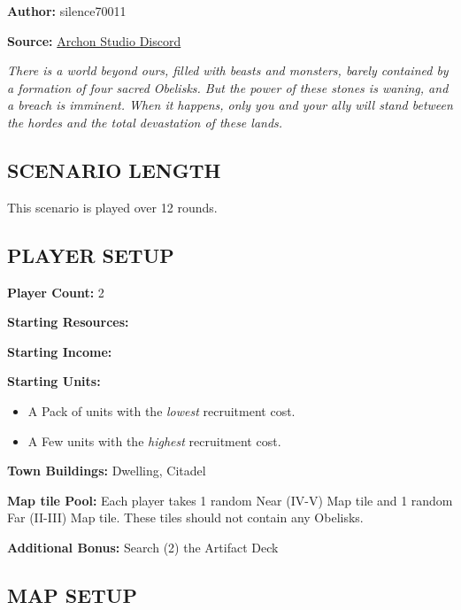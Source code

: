 
\begin{multicols}{2}

\textbf{Author:} silence70011

\textbf{Source:} \href{https://discord.com/channels/740870068178649108/1233112440322002964/1233112440322002964}{Archon Studio Discord}

\textit{There is a world beyond ours, filled with beasts and monsters, barely contained by a formation of four sacred Obelisks.
  But the power of these stones is waning, and a breach is imminent.
  When it happens, only you and your ally will stand between the hordes and the total devastation of these lands.
}

\subsection*{\MakeUppercase{Scenario Length}}

This scenario is played over 12 rounds.

\subsection*{\MakeUppercase{Player Setup}}

\textbf{Player Count:} 2

\textbf{Starting Resources:}\par
{}

\textbf{Starting Income:}\par
{}

\textbf{Starting Units:}
\begin{itemize}
  \item A Pack of  units with the \textit{lowest} recruitment cost.
  \item A Few  units with the \textit{highest} recruitment cost.
\end{itemize}

\textbf{Town Buildings:}  Dwelling, Citadel

\textbf{Map tile Pool:} Each player takes 1 random Near (IV-V) Map tile and 1 random Far (II-III) Map tile. These tiles should not contain any Obelisks.

\textbf{Additional Bonus:} Search (2) the Artifact Deck

\subsection*{\MakeUppercase{Map Setup}}


\end{multicols}
